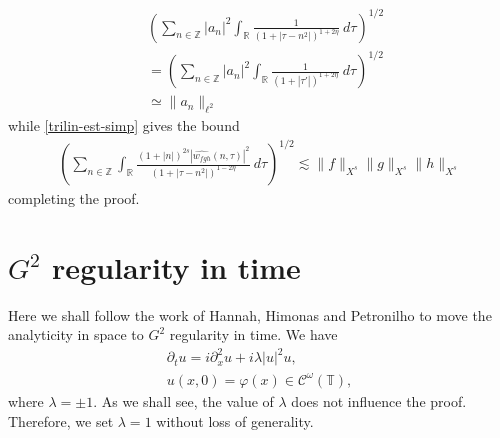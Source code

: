 \documentclass[12pt,reqno]{amsart}
\numberwithin{equation}{section}  %
\numberwithin{figure}{section}
\newcommand{\rr}{\mathbb{R}}
\newcommand{\zz}{\mathbb{Z}}
\newcommand{\wh}{\widehat}
\theoremstyle{plain}
\theoremstyle{definition}
\theoremstyle{remark}
\begin{document}
\begin{equation*}
  \begin{split}
    & \left( \sum_{n \in \zz} | a_{n} |^2\int_{\rr} \frac{1}{\left( 1 + | \tau -
    n^{2} | \right)^{1 + 2 \eta}} \ d \tau  
    \right)^{1/2} 
    \\
    & = \left ( \sum_{n \in \zz}
    | a_n |^2 
    \int_{\rr} \frac{1}{\left( 1 + | \tau' | \right)^{1 + 2 \eta}} \ d 
    \tau \right)^{1/2}
    \\
    & \simeq \|a_n\|_{\ell^2}
    \end{split}
\end{equation*}
while \eqref{trilin-est-simp} gives the bound
\begin{equation*}
  \begin{split}
    \left ( \sum_{n \in \zz}\int_{\rr} \frac{\left (1 + |n| \right )^{2s} | \wh{{w}_{fgh}}(n, \tau) 
    |^2}{\left( 1 + | \tau - n^{2} | \right)^{1 - 2 \eta}}\ d \tau 
    \right)^{1/2} \lesssim \|f\|_{X^s} \|g\|_{X^s} \|h\|_{X^s}
  \end{split}
\end{equation*}
%
completing the proof.
\qquad \qedsymbol
%





%
%
%
%
%
%
%
%
%



%
\section{$G^2$  regularity in time} 
\label{g2-rreg-3}
%
%
Here we shall  follow the work of  Hannah, Himonas and Petronilho
\cite{Hannah:2006uq}
to move the analyticity in space to $G^2$ regularity in time.
We have 
%
%
\begin{gather}
  \label{eqn:nls-t}
  \partial_tu=i\partial_x^2u+i\lambda |u|^2u,
  \\
  \label{eqn:nls-t-data}
  u(x,0)=\varphi(x) \in \mathcal{C}^\omega(\mathbb{T}),
\end{gather}
%
where $\lambda = \pm 1$. As we
shall see, the value of $\lambda$ does not influence the proof. Therefore, we
set $\lambda =1$ without loss of generality. 








%
%
%
%
%
%
%
%
%
\end{document}
